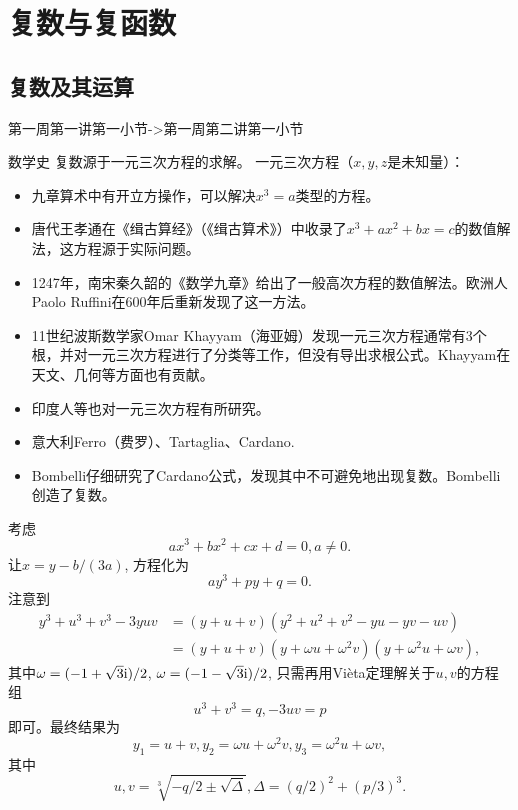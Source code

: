 \chapter{复数与复函数}
\section{复数及其运算}
第一周第一讲第一小节->第一周第二讲第一小节

数学史
复数源于一元三次方程的求解。
一元三次方程（$x,y,z$是未知量）：
\begin{itemize}
    \item 九章算术中有开立方操作，可以解决$x^3=a$类型的方程。
    \item 唐代王孝通在《缉古算经》（《缉古算术》）中收录了$x^3+ax^2+bx=c$的数值解法，这方程源于实际问题。
    \item 1247年，南宋秦久韶的《数学九章》给出了一般高次方程的数值解法。欧洲人Paolo Ruffini在600年后重新发现了这一方法。
    \item 11世纪波斯数学家Omar Khayyam（海亚姆）发现一元三次方程通常有3个根，并对一元三次方程进行了分类等工作，但没有导出求根公式。Khayyam在天文、几何等方面也有贡献。
    \item 印度人等也对一元三次方程有所研究。
    \item 意大利Ferro（费罗）、Tartaglia、Cardano.
    \item Bombelli仔细研究了Cardano公式，发现其中不可避免地出现复数。Bombelli创造了复数。
\end{itemize}
考虑
\begin{equation*}
    ax^3+bx^2+cx+d=0,a\neq 0.
\end{equation*}
让$x=y-b/(3a)$, 方程化为
\begin{equation*}
    ay^3+py+q=0.
\end{equation*}
注意到
\begin{align*}
    y^3+u^3+v^3-3yuv&=(y+u+v)(y^2+u^2+v^2-yu-yv-uv)
    \\ &=(y+u+v)(y+\omega u+\omega^2 v)(y+\omega^2 u+\omega v),
\end{align*}
其中$\omega=(-1+\sqrt{3}\mathrm{i})/2$, $\omega=(-1-\sqrt{3}\mathrm{i})/2$, 只需再用Vi\`eta定理解关于$u,v$的方程组
\begin{equation*}
    u^3+v^3=q, -3uv=p
\end{equation*}
即可。最终结果为
\begin{equation*}
    y_1=u+v,y_2=\omega u+\omega^2 v,y_3=\omega^2 u+\omega v,
\end{equation*}
其中
\begin{equation*}
    u,v=\sqrt[3]{-q/2\pm\sqrt{\Delta}},\Delta=(q/2)^2+(p/3)^3.
\end{equation*}
